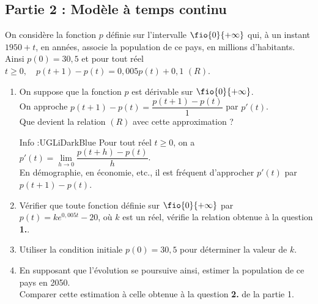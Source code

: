 \documentclass[a4paper,11pt,exos]{nsi}
\begin{document}
\subsection*{Partie 2 : Modèle à temps continu}
On considère la fonction $p$ définie sur l'intervalle $\fio{0}{+\infty}$ qui, à un instant $1950+t$, en années, associe la population de ce pays, en millions d'habitants.\\
Ainsi $p(0)=30,5$ et pour tout réel $t\geqslant 0, \quad p(t+1)-p(t)=0,005p(t)+0,1$ \textbf{$(R)$}.
\begin{enumerate}
    \item On suppose que la fonction $p$ est dérivable sur $\fio{0}{+\infty}$.\\[.5em]
    On approche $p(t+1)-p(t)=\dfrac{p(t+1)-p(t)}{1}$ par $p'(t)$.\\[.5em]
    Que devient la relation $(R)$ avec cette approximation ?
    \begin{encadrecolore}{Info :}{UGLiDarkBlue}
        Pour tout réel $t\geqslant 0$, on a $p'(t)=\lim\limits_{h\to 0}\dfrac{p(t+h)-p(t)}{h}$.\\[.5em]
        En démographie, en économie, etc., il est fréquent d'approcher $p'(t)$ par $p(t+1)-p(t)$.
    \end{encadrecolore}  
    \item Vérifier que toute fonction définie sur $\fio{0}{+\infty}$ par $p(t)=k e^{0,005t}-20$, où $k$ est un réel, vérifie la relation obtenue à la question \textbf{1.}.
    \item Utiliser la condition initiale $p(0)=30,5$ pour déterminer la valeur de $k$.
    \item En supposant que l'évolution se poursuive ainsi, estimer la population de ce pays en 2050.\\
    Comparer cette estimation à celle obtenue à la question \textbf{2.} de la partie 1.
\end{enumerate}
\end{document}
